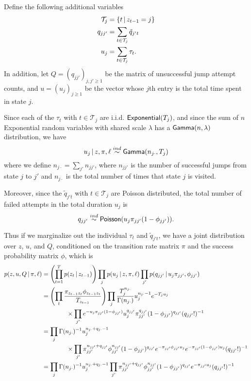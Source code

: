 Define the following additional variables
\begin{align}
  \label{eq:56} \mathcal{T}_j &= \{t \, \vert \, z_{t-1} = j\} \\ q_{jj'}
&= \sum_{t \in \mathcal{T}_j}\tilde{q}_{j't} \\ u_j &= \sum_{t \in
\mathcal{T}_j} \tau_t.
\end{align} In addition, let $Q = (q_{jj'})_{j,j' \geq 1}$ be the
matrix of unsuccessful jump attempt counts, and $u = (u_j)_{j \geq 1}$
be the vector whose $j$th entry is the total time spent in state $j$.

Since each of the $\tau_t$ with $t \in \mathcal{T}_j$ are
i.i.d. $\mathsf{Exponential}(T_j)$, and since the sum of $n$ Exponential random
variables with shared scale $\lambda$ has a $\mathsf{Gamma}(n,\lambda)$
distribution, we have
\begin{equation} u_j \, \vert \, z, \pi, \ell \stackrel{ind}{\sim}
\mathsf{Gamma}(n_{j\cdot},T_j)
\end{equation} where we define $n_{j\cdot} = \sum_{j'} n_{jj'}$, where
$n_{jj'}$ is the number of successful jumps from state $j$ to $j'$ and
$n_{j\cdot}$ is the total number of times that state $j$ is visited.

Moreover, since the $\tilde{q}_{j't}$ with $t \in \mathcal{T}_j$ are
Poisson distributed, the total number of failed attempts in the total
duration $u_j$ is
\begin{equation}
  \label{eq:60} q_{jj'} \stackrel{ind}{\sim}
\mathsf{Poisson}(u_j\pi_{jj'}(1-\phi_{jj'})).
\end{equation}

Thus if we marginalize out the individual $\tau_t$ and
$\tilde{q}_{j't}$, we have a joint distribution over $z$, $u$, and
$Q$, conditioned on the transition rate matrix $\pi$ and the success
probability matrix $\phi$, which is
\begin{align}
  \label{eq:54} p(z, u, Q \, \vert \, \pi, \ell) &= \left(\prod_{t=1}^T
p(z_{t} \, \vert \, z_{t-1})\right) \prod_{j} p(u_j \, \vert \, z, \pi, \ell)
\prod_{j'} p(q_{jj'} \, \vert \, u_j \pi_{jj'}, \phi_{jj'}) \\ &=
\left(\prod_{t}
\frac{\pi_{z_{t-1}z_t}\phi_{z_{t-1}z_t}}{T_{z_{t-1}}}\right) \prod_{j}
\frac{T_j^{n_{j\cdot}}}{\Gamma(n_{j\cdot})} u_j^{n_{j\cdot} - 1}
e^{-T_j u_j} \\ &\qquad\qquad\times \prod_{j'}
e^{-u_j\pi_{jj'}(1-\phi_{jj'})} u_j^{q_{jj'}} \pi_{jj'}^{q_{jj'}}
(1-\phi_{jj'})^{q_{jj'}} (q_{jj'}!)^{-1} \\ &= \prod_{j}
\Gamma(n_{j\cdot})^{-1} u_j^{n_{j\cdot} + q_{j\cdot}-1} \\
&\qquad\qquad \times \prod_{j'} \pi_{jj'}^{n_{jj'} + q_{jj'}}
\phi_{jj'}^{n_{jj'}} (1-\phi_{jj'})^{q_{jj'}}
e^{-\pi_{jj'}\phi_{jj'}u_j} e^{-\pi_{jj'}(1-\phi_{jj'})u_j}
(q_{jj'}!)^{-1} \\ &\label{eq:joint-likelihood} = \prod_{j}
\Gamma(n_{j\cdot})^{-1} u_j^{n_{j\cdot} + q_{j\cdot}-1} \prod_{j'}
\pi_{jj'}^{n_{jj'} + q_{jj'}} \phi_{jj'}^{n_{jj'}}
(1-\phi_{jj'})^{q_{jj'}} e^{-\pi_{jj'}u_j} (q_{jj'}!)^{-1}
\end{align}

